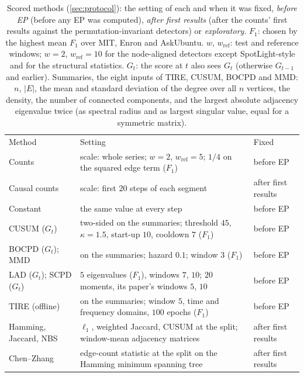 \documentclass[11pt]{article}
\let\dsmidrule\midrule
\renewcommand{\midrule}{\arrayrulecolor{dsrule}\dsmidrule\arrayrulecolor{dsnavy}}
\theoremstyle{dsplain}
\theoremstyle{definition}
\begin{document}
\begin{table}[!htb]
  \centering
  \caption{Scored methods (\cref{sec:protocol}): the setting of each and when it was fixed, \emph{before
  EP} (before any EP was computed), \emph{after first results} (after the counts' first results against
  the permutation-invariant detectors) or \emph{exploratory}. $F_1$: chosen by the highest mean $F_1$
  over MIT, Enron and AskUbuntu. $w$, $w_{\mathrm{ref}}$: test and reference windows; $w = 2$,
  $w_{\mathrm{ref}} = 10$ for the node-aligned detectors except SpotLight-style and for the structural
  statistics. $G_t$: the score at $t$ also sees $G_t$ (otherwise $G_{t-1}$ and earlier). Summaries, the
  eight inputs of TIRE, CUSUM, BOCPD and MMD: $n$, $|E|$, the mean and standard deviation of the degree
  over all $n$ vertices, the density, the number of connected components, and the largest absolute
  adjacency eigenvalue twice (as spectral radius and as largest singular value, equal for a symmetric
  matrix).}
  \label{tab:rows}
  \scriptsize
  \setlength{\tabcolsep}{3pt}
  \begin{tabular}{@{}lll@{}}
    \toprule
    Method & Setting & Fixed \\
    \midrule
    Counts & scale: whole series; $w = 2$, $w_{\mathrm{ref}} = 5$; $1/4$ on the squared edge term ($F_1$) & before EP \\
    Causal counts & scale: first $20$ steps of each segment & after first results \\
    Constant & the same value at every step & before EP \\
    \midrule
    CUSUM ($G_t$) & two-sided on the summaries; threshold $45$, $\kappa = 1.5$, start-up $10$, cooldown $7$ ($F_1$) & before EP \\
    BOCPD ($G_t$); MMD & on the summaries; hazard $0.1$; window $3$ ($F_1$) & before EP \\
    LAD ($G_t$); SCPD ($G_t$) & $5$ eigenvalues ($F_1$), windows $7$, $10$; $20$ moments, its paper's windows $5$, $10$ & before EP \\
    TIRE (offline) & on the summaries; window $5$, time and frequency domains, $100$ epochs ($F_1$) & before EP \\
    \midrule
    Hamming, Jaccard, NBS & $\ell_1$, weighted Jaccard, CUSUM at the split; window-mean adjacency matrices & after first results \\
    Chen--Zhang & edge-count statistic at the split on the Hamming minimum spanning tree & after first results \\

\end{tabular}
\end{table}
\end{document}
